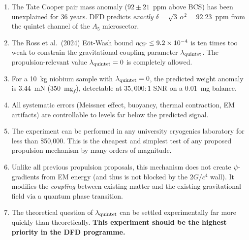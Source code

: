 \documentclass[12pt,a4paper]{article}
\theoremstyle{definition}
\theoremstyle{remark}
\begin{document}
\begin{enumerate}
\item The Tate Cooper pair mass anomaly ($92 \pm 21$~ppm above BCS) has been
unexplained for 36 years.  DFD predicts \emph{exactly} $\delta = \sqrt{3}\,\alpha^2
= 92.23$~ppm from the quintet channel of the $A_5$ microsector.

\item The Ross et al.\ (2024) E\"ot-Wash bound $\eta_{\rm CP} \leq 9.2 \times 10^{-4}$
is ten times too weak to constrain the gravitational coupling parameter
$\lambda_{\rm quintet}$.  The propulsion-relevant value $\lambda_{\rm quintet} = 0$
is completely allowed.

\item For a 10~kg niobium sample with $\lambda_{\rm quintet} = 0$, the predicted
weight anomaly is 3.44~mN (350~mg$_f$), detectable at $35{,}000\!:\!1$ SNR on
a 0.01~mg balance.

\item All systematic errors (Meissner effect, buoyancy, thermal contraction,
EM artifacts) are controllable to levels far below the predicted signal.

\item The experiment can be performed in any university cryogenics laboratory
for less than \$50{,}000.  This is the cheapest and simplest test of any
proposed propulsion mechanism by many orders of magnitude.

\item Unlike all previous propulsion proposals, this mechanism does not create
$\psi$-gradients from EM energy (and thus is not blocked by the $2G/c^4$ wall).
It modifies the \emph{coupling} between existing matter and the existing
gravitational field via a quantum phase transition.

\item The theoretical question of $\lambda_{\rm quintet}$ can be settled
experimentally far more quickly than theoretically.  \textbf{This experiment
should be the highest priority in the DFD programme.}
\end{enumerate}
\end{document}

